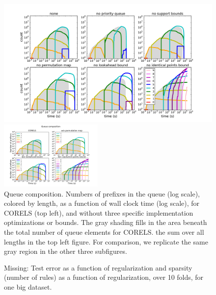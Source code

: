 \begin{figure}[t!]
\begin{center}
\begin{arxiv}
\includegraphics[width=\textwidth]{figs/ela_compas_compare-queue.pdf}
\end{arxiv}
\begin{kdd}
\includegraphics[trim={30mm 15mm 35mm 30mm}, width=0.45\textwidth]{figs/kdd_compas_compare_small-queue.pdf}
\end{kdd}
\end{center}
\caption{Queue composition. %
%
Numbers of prefixes in the queue (log scale), colored by length,
as a function of wall clock time (log scale), for CORELS (top left),
and without three specific implementation optimizations or bounds.
%
The gray shading fills in the area beneath the total number of
queue elements for CORELS.
\ie the sum over all lengths in the top left figure.
%
For comparison, we replicate the same gray region
in the other three subfigures.
}
\label{fig:queue}
\end{figure}

\begin{arxiv}
\begin{figure}[t!]
\begin{center}
\end{center}
\caption{Missing:  Test error as a function of regularization and sparsity
(number of rules) as a function of regularization, over 10 folds,
for one big dataset.}
\label{fig:regularization}
\end{figure}
\end{arxiv}

